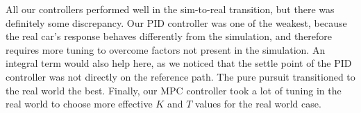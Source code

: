 \documentclass{article}
\begin{document}
All our controllers performed well in the sim-to-real transition,
but there was definitely some discrepancy. Our PID controller was
one of the weakest, because the real car's response behaves differently
from the simulation, and therefore requires more tuning to
overcome factors not present in the simulation. An integral term
would also help here, as we noticed that the settle point of
the PID controller was not directly on the reference path.
The pure pursuit transitioned to the real world the best.
Finally, our MPC controller took a lot of tuning in the real world
to choose more effective $K$ and $T$ values for the real world case.
\end{document}
